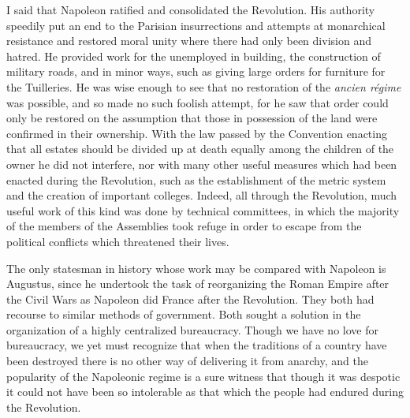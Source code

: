 \documentclass{book}
\begin{document}
I said that Napoleon ratified and consolidated the Revolution. His authority speedily put an end to the Parisian insurrections and attempts at monarchical resistance and restored moral unity where there had only been division and hatred. He provided work for the unemployed in building, the construction of military roads, and in minor ways, such as giving large orders for furniture for the Tuilleries. He was wise enough to see that no restoration of the \emph{ancien régime} was possible, and so made no such foolish attempt, for he saw that order could only be restored on the assumption that those in possession of the land were confirmed in their ownership. With the law passed by the Convention enacting that all estates should be divided up at death equally among the children of the owner he did not interfere, nor with many other useful measures which had been enacted during the Revolution, such as the establishment of the metric system and the creation of important colleges. Indeed, all through the Revolution, much useful work of this kind was done by technical committees, in which the majority of the members of the Assemblies took refuge in order to escape from the political conflicts which threatened their lives.

The only statesman in history whose work may be compared with Napoleon is Augustus, since he undertook the task of reorganizing the Roman Empire after the Civil Wars as Napoleon did France after the Revolution. They both had recourse to similar methods of government. Both sought a solution in the organization of a highly centralized bureaucracy. Though we have no love for bureaucracy, we yet must recognize that when the traditions of a country have been destroyed there is no other way of delivering it from anarchy, and the popularity of the Napoleonic regime is a sure witness that though it was despotic it could not have been so intolerable as that which the people had endured during the Revolution.
\end{document}
